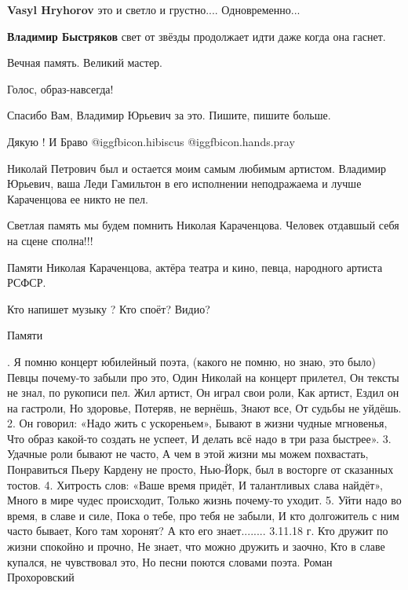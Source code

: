 \begin{itemize}
\begin{itemize} %
\textbf{Vasyl Hryhorov} это и светло и грустно.... Одновременно...

\textbf{Владимир Быстряков} свет от звёзды продолжает идти даже когда она гаснет.
\end{itemize} %

Вечная память. Великий мастер.

Голос, образ-навсегда!

Спасибо Вам, Владимир Юрьевич за это. Пишите, пишите больше.

Дякую ! И Браво  @igg{fbicon.hibiscus}  @igg{fbicon.hands.pray} 


Николай Петрович был и остается моим самым любимым артистом. Владимир Юрьевич,
ваша Леди Гамильтон в его исполнении неподражаема и лучше Караченцова ее никто
не пел.


Светлая память мы будем помнить Николая Караченцова. Человек отдавшый себя на
сцене сполна!!!


Памяти Николая Караченцова, актёра театра и кино, певца, народного артиста РСФСР.

Кто напишет музыку ? Кто споёт? Видио?

Памяти

. Я помню концерт юбилейный поэта,
(какого не помню, но знаю, это было)
Певцы почему-то забыли про это,
Один Николай на концерт прилетел,
Он тексты не знал, по рукописи пел.
Жил артист,
Он играл свои роли,
Как артист,
Ездил он на гастроли,
Но здоровье,
Потеряв, не вернёшь,
Знают все,
От судьбы не уйдёшь.
2. Он говорил: «Надо жить с ускореньем»,
Бывают в жизни чудные мгновенья,
Что образ какой-то создать не успеет,
И делать всё надо в три раза быстрее».
3. Удачные роли бывают не часто,
А чем в этой жизни мы можем похвастать,
Понравиться Пьеру Кардену не просто,
Нью-Йорк, был в восторге от сказанных тостов.
4. Хитрость слов: «Ваше время придёт,
И талантливых слава найдёт»,
Много в мире чудес происходит,
Только жизнь почему-то уходит.
5. Уйти надо во время, в славе и силе,
Пока о тебе, про тебя не забыли,
И кто долгожитель с ним часто бывает,
Кого там хоронят? А кто его знает........
3.11.18 г.
Кто дружит по жизни спокойно и прочно,
Не знает, что можно дружить и заочно,
Кто в славе купался, не чувствовал это,
Но песни поются словами поэта.
Роман Прохоровский
\restorecr


\end{itemize}
